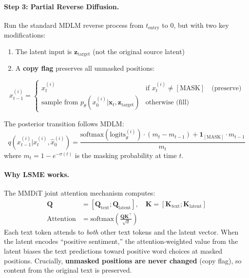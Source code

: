 \documentclass{article}
\begin{document}
\paragraph{Step 3: Partial Reverse Diffusion.}
Run the standard MDLM reverse process from $t_\text{entry}$ to $0$, but with two key modifications:
\begin{enumerate}
    \item The latent input is $\mathbf{z}_\text{target}$ (not the original source latent)
    \item A \textbf{copy flag} preserves all unmasked positions:
\end{enumerate}
\begin{equation}
    x_{t-1}^{(i)} = \begin{cases}
        x_t^{(i)} & \text{if } x_t^{(i)} \neq [\text{MASK}] \quad \text{(preserve)} \\
        \text{sample from } p_\theta(x_0^{(i)} | \mathbf{x}_t, \mathbf{z}_\text{target}) & \text{otherwise (fill)}
    \end{cases}
\end{equation}

The posterior transition follows MDLM:
\begin{equation}
    q(x_{t-1}^{(i)} | x_t^{(i)}, \hat{x}_0^{(i)}) =
    \frac{\text{softmax}(\text{logits}_\theta^{(i)}) \cdot (m_t - m_{t-1}) + \mathbf{1}_{[\text{MASK}]} \cdot m_{t-1}}{m_t}
\end{equation}
where $m_t = 1 - e^{-\sigma(t)}$ is the masking probability at time $t$.

\paragraph{Why LSME works.}
The MMDiT joint attention mechanism computes:
\begin{align}
    \mathbf{Q} &= [\mathbf{Q}_\text{text}; \mathbf{Q}_\text{latent}], \quad
    \mathbf{K} = [\mathbf{K}_\text{text}; \mathbf{K}_\text{latent}] \\
    \text{Attention} &= \text{softmax}\left(\frac{\mathbf{Q}\mathbf{K}^\top}{\sqrt{d}}\right)
\end{align}
Each text token attends to \emph{both} other text tokens and the latent vector.
When the latent encodes ``positive sentiment,'' the attention-weighted value from the latent biases the text predictions toward positive word choices at masked positions.
Crucially, \textbf{unmasked positions are never changed} (copy flag), so content from the original text is preserved.
\end{document}
